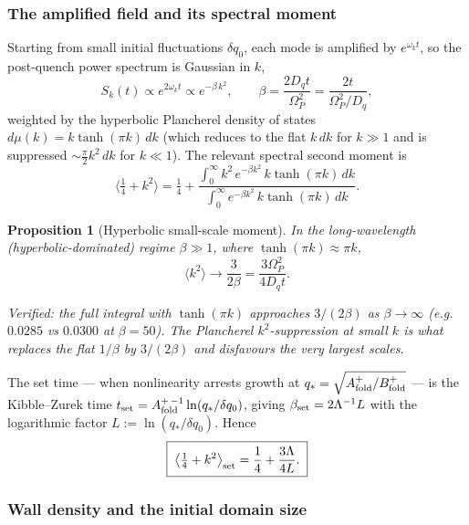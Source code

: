 \documentclass[11pt,a4paper]{article}
\newcommand{\Op}{\Omega_P}
\newcommand{\Af}{A_{\rm fold}}
\newcommand{\Bf}{B_{\rm fold}}
\newcommand{\Dq}{D_q}
\newcommand{\Lam}{\Lambda}
\newcommand{\note}[1]{\textcolor{black!65}{\emph{#1}}}
\theoremstyle{plain}
\newtheorem{proposition}{Proposition}[section]
\theoremstyle{definition}
\theoremstyle{remark}
\begin{document}
\subsubsection{The amplified field and its spectral moment}

Starting from small initial fluctuations $\delta q_0$, each mode is amplified by $e^{\omega_k t}$, so the
post-quench power spectrum is Gaussian in $k$,
\begin{equation}
S_k(t)\propto e^{2\omega_k t}\propto e^{-\beta\,k^2},
\qquad
\beta=\frac{2\Dq t}{\Op^{2}}=\frac{2t}{\Op^2/\Dq},
\end{equation}
weighted by the hyperbolic Plancherel density of states $d\mu(k)=k\tanh(\pi k)\,dk$ (which reduces to the
flat $k\,dk$ for $k\gg1$ and is suppressed $\sim\tfrac{\pi}{2}k^2\,dk$ for $k\ll1$). The relevant spectral
second moment is
\begin{equation}
\bigl\langle\tfrac14+k^2\bigr\rangle
=\tfrac14+\frac{\displaystyle\int_0^\infty k^2\,e^{-\beta k^2}\,k\tanh(\pi k)\,dk}
{\displaystyle\int_0^\infty e^{-\beta k^2}\,k\tanh(\pi k)\,dk}.
\end{equation}

\begin{proposition}[Hyperbolic small-scale moment]
In the long-wavelength (hyperbolic-dominated) regime $\beta\gg1$, where $\tanh(\pi k)\approx\pi k$,
\begin{equation}
\langle k^2\rangle\to\frac{3}{2\beta}=\frac{3\Op^2}{4\Dq t}.
\end{equation}
\end{proposition}
\note{Verified: the full integral with $\tanh(\pi k)$ approaches $3/(2\beta)$ as $\beta\to\infty$
(e.g.\ $0.0285$ vs $0.0300$ at $\beta=50$). The Plancherel $k^2$-suppression at small $k$ is what
replaces the flat $1/\beta$ by $3/(2\beta)$ and disfavours the very largest scales.}

The set time --- when nonlinearity arrests growth at $q_\ast=\sqrt{\Af^+/\Bf^+}$ --- is the
Kibble--Zurek time $t_{\rm set}=\Af^{+\,-1}\ln(q_\ast/\delta q_0)$, giving
$\beta_{\rm set}=2\Lam^{-1}L$ with the logarithmic factor $L:=\ln(q_\ast/\delta q_0)$. Hence
\begin{equation}
\boxed{\;\bigl\langle\tfrac14+k^2\bigr\rangle_{\rm set}=\frac14+\frac{3\Lam}{4L}.\;}
\end{equation}

\subsubsection{Wall density and the initial domain size}
\end{document}
